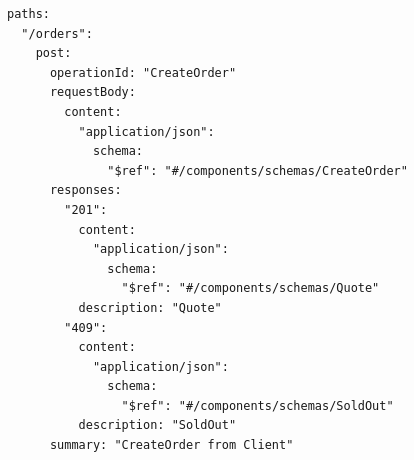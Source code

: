 \begin{lstlisting}[language={},basicstyle=\ttfamily\footnotesize,breaklines=true]
paths:
  "/orders":
    post:
      operationId: "CreateOrder"
      requestBody:
        content:
          "application/json":
            schema:
              "$ref": "#/components/schemas/CreateOrder"
      responses:
        "201":
          content:
            "application/json":
              schema:
                "$ref": "#/components/schemas/Quote"
          description: "Quote"
        "409":
          content:
            "application/json":
              schema:
                "$ref": "#/components/schemas/SoldOut"
          description: "SoldOut"
      summary: "CreateOrder from Client"
\end{lstlisting}

